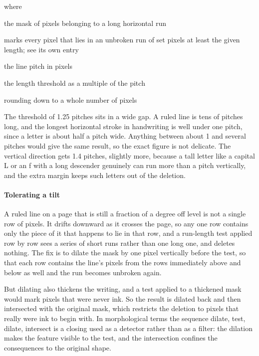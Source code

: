 \noindent where
\begin{description}[leftmargin=2.4em,style=nextline,font=\normalfont\ttfamily]\setlength\itemsep{1pt}
  \item[{$\mathrm{flat}$}] \normalfont the mask of pixels belonging to a long horizontal run
  \item[{$\mathrm{LongRunMask}$}] \normalfont marks every pixel that lies in an unbroken run of set pixels at least the given length; see its own entry
  \item[{$P$}] \normalfont the line pitch in pixels
  \item[{$1.25$}] \normalfont the length threshold as a multiple of the pitch
  \item[{$\lfloor \cdot \rfloor$}] \normalfont rounding down to a whole number of pixels
\end{description}
The threshold of 1.25 pitches sits in a wide gap. A ruled line is tens of pitches long, and the longest horizontal stroke in handwriting is well under one pitch, since a letter is about half a pitch wide. Anything between about 1 and several pitches would give the same result, so the exact figure is not delicate. The vertical direction gets 1.4 pitches, slightly more, because a tall letter like a capital L or an f with a long descender genuinely can run more than a pitch vertically, and the extra margin keeps such letters out of the deletion.


\paragraph{Tolerating a tilt}
A ruled line on a page that is still a fraction of a degree off level is not a single row of pixels. It drifts downward as it crosses the page, so any one row contains only the piece of it that happens to lie in that row, and a run-length test applied row by row sees a series of short runs rather than one long one, and deletes nothing. The fix is to dilate the mask by one pixel vertically before the test, so that each row contains the line's pixels from the rows immediately above and below as well and the run becomes unbroken again.

But dilating also thickens the writing, and a test applied to a thickened mask would mark pixels that were never ink. So the result is dilated back and then intersected with the original mask, which restricts the deletion to pixels that really were ink to begin with. In morphological terms the sequence dilate, test, dilate, intersect is a closing used as a detector rather than as a filter: the dilation makes the feature visible to the test, and the intersection confines the consequences to the original shape.

